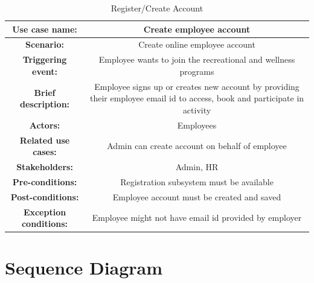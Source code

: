 \begin{table}[h!t]
\caption{Register/Create Account}

\begin{center}
\begin{tabular}{|c|c|}
\hline

\rule{0pt}{24pt}  \textbf{Use case name:} & Create employee account \\
\hline
\rule{0pt}{24pt}  \textbf{Scenario:} & Create online employee account \\
\hline
\rule{0pt}{24pt}  \textbf{Triggering event:} & Employee wants to join the recreational and wellness programs \\
\hline
\rule{0pt}{24pt}  \textbf{Brief description:} & Employee signs up or creates new account by providing their employee email id to access, book and participate in activity \\
\hline
\rule{0pt}{24pt}  \textbf{Actors:} & Employees \\
\hline
\rule{0pt}{24pt}  \textbf{Related use cases:} & Admin can create account on behalf of employee \\
\hline
\rule{0pt}{24pt}  \textbf{Stakeholders:} & Admin, HR \\
\hline
\rule{0pt}{24pt}  \textbf{Pre-conditions:} & Registration subsystem must be available \\
\hline
\rule{0pt}{24pt}  \textbf{Post-conditions:} & Employee account must be created and saved \\
\hline
\rule{0pt}{24pt}  \textbf{Exception conditions:} & Employee might not have email id provided by employer \\
\hline
\end{tabular}
\end{center}
\label{tab:createAccount}
\end{table}


\section{Sequence Diagram}

